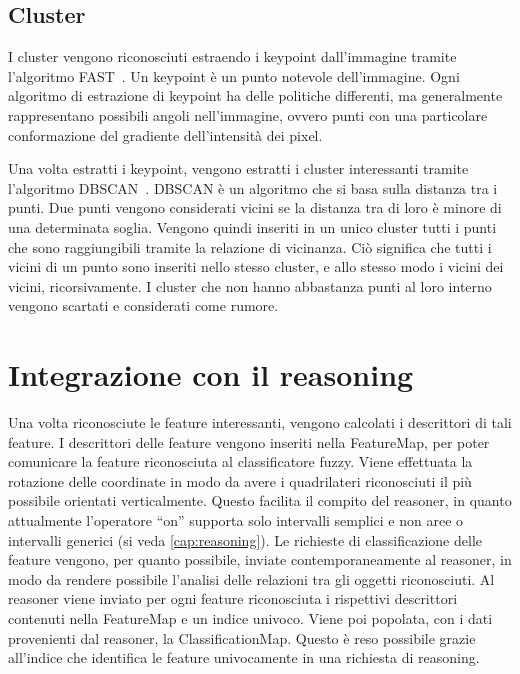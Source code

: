 \subsection{Cluster}

I cluster vengono riconosciuti estraendo i keypoint dall'immagine tramite l'algoritmo FAST~\cite{rosten_2006_machine}.
Un keypoint è un punto notevole dell'immagine. Ogni algoritmo di estrazione di keypoint ha delle politiche differenti, ma generalmente rappresentano possibili angoli nell'immagine, ovvero punti con una particolare conformazione del gradiente dell'intensità dei pixel.

Una volta estratti i keypoint, vengono estratti i cluster interessanti tramite l'algoritmo DBSCAN~\cite{ester1996density}.
DBSCAN è un algoritmo che si basa sulla distanza tra i punti. Due punti vengono considerati vicini se la distanza tra di loro è minore di una determinata soglia. Vengono quindi inseriti in un unico cluster tutti i punti che sono raggiungibili tramite la relazione di vicinanza. Ciò significa che tutti i vicini di un punto sono inseriti nello stesso cluster, e allo stesso modo i vicini dei vicini, ricorsivamente.
I cluster che non hanno abbastanza punti al loro interno vengono scartati e considerati come rumore.

\section{Integrazione con il reasoning}
Una volta riconosciute le feature interessanti, vengono calcolati i descrittori di tali feature. I descrittori delle feature vengono inseriti nella FeatureMap, per poter comunicare la feature riconosciuta al classificatore fuzzy.
Viene effettuata la rotazione delle coordinate in modo da avere i quadrilateri riconosciuti il più possibile orientati verticalmente. Questo facilita il compito del reasoner, in quanto attualmente l'operatore ``on'' supporta solo intervalli semplici e non aree o intervalli generici (si veda \autoref{cap:reasoning}).
Le richieste di classificazione delle feature vengono, per quanto possibile, inviate contemporaneamente al reasoner, in modo da rendere possibile l'analisi delle relazioni tra gli oggetti riconosciuti. Al reasoner viene inviato per ogni feature riconosciuta i rispettivi descrittori contenuti nella FeatureMap e un indice univoco. Viene poi popolata, con i dati provenienti dal reasoner, la ClassificationMap. Questo è reso possibile grazie all'indice che identifica le feature univocamente in una richiesta di reasoning.


